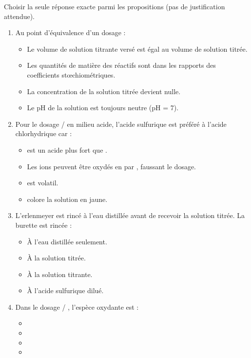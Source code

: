 \documentclass[11pt]{article}
\begin{document}
\begin{exercice}
Choisir la seule réponse exacte parmi les propositions (pas de justification attendue).
\begin{enumerate}
    \item Au point d'équivalence d'un dosage :
    \begin{itemize}
        \item[A.] Le volume de solution titrante versé est égal au volume de solution titrée.
        \item[B.] Les quantités de matière des réactifs sont dans les rapports des coefficients stœchiométriques.
        \item[C.] La concentration de la solution titrée devient nulle.
        \item[D.] Le pH de la solution est toujours neutre (pH = 7).
    \end{itemize}
    \item Pour le dosage  /  en milieu acide, l'acide sulfurique est préféré à l'acide chlorhydrique car :
    \begin{itemize}
        \item[A.]  est un acide plus fort que .
        \item[B.] Les ions  peuvent être oxydés en  par , faussant le dosage.
        \item[C.]  est volatil.
        \item[D.]  colore la solution en jaune.
    \end{itemize}
    \item L'erlenmeyer est rincé à l'eau distillée avant de recevoir la solution titrée. La burette est rincée :
    \begin{itemize}
        \item[A.] À l'eau distillée seulement.
        \item[B.] À la solution titrée.
        \item[C.] À la solution titrante.
        \item[D.] À l'acide sulfurique dilué.
    \end{itemize}
    \item Dans le dosage  / , l'espèce oxydante est :
    \begin{itemize}
        \item[A.] 
        \item[B.] 
        \item[C.] 
        \item[D.] 
    \end{itemize}
\end{enumerate}
\end{exercice}
\end{document}
